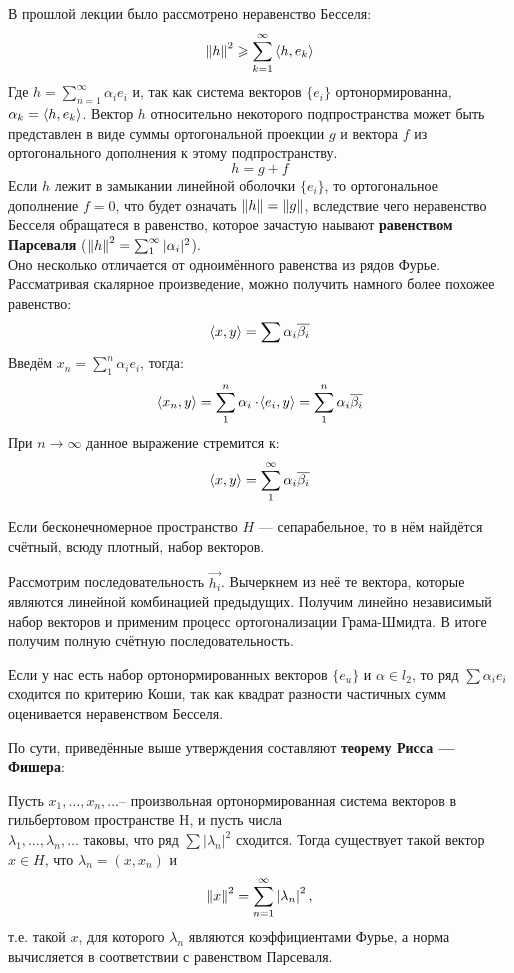 \documentclass[12pt]{article}
\begin{document}
	В прошлой лекции было рассмотрено неравенство Бесселя: \\
	$$\left\| h \right\|^2 \geqslant \sum_{k=1}^{\infty}\left\langle h, e_k \right\rangle$$
	Где $h = \sum_{n=1}^{\infty} \alpha_i e_i$ и, так как система векторов $\{ e_i \}$ ортонормированна, 
	$\alpha_k = \left\langle h, e_k \right\rangle$. Вектор $h$ относительно некоторого подпространства может быть представлен в виде суммы
	ортогональной проекции $g$ и вектора $f$ из ортогонального дополнения к этому подпространству. 
	$$h = g + f$$
	Если $h$ лежит в замыкании линейной оболочки $\{ e_i \}$, то ортогональное дополнение $f = 0$, что будет означать 
	$\left\| h \right\| = \left\| g \right\|$, вследствие чего неравенство Бесселя обращатеся в равенство, которое зачастую наывают 
	\textbf{равенством Парсеваля} ($\left\| h \right\|^2 = \sum_1^{\infty} |\alpha_i|^2$).\\
	Оно несколько отличается от одноимённого равенства из рядов Фурье. Рассматривая скалярное произведение, можно получить
	намного более похожее равенство:
	$$ \left\langle x, y \right\rangle = \sum \alpha_i \overline{\beta_i} $$
	Введём $x_n = \sum_1^n \alpha_i e_i$, тогда:
	$$ \left\langle x_n, y \right\rangle = \sum_1^n \alpha_i \cdot \! \left\langle e_i, y \right\rangle = \sum_1^n \alpha_i \overline{\beta_i}$$
	При $n \rightarrow \infty$ данное выражение стремится к:
	$$ \left\langle x, y \right\rangle = \sum_1^{\infty} \alpha_i \overline{\beta_i} $$
	
	Если бесконечномерное пространство $H$ --- сепарабельное, то в нём найдётся счётный, всюду плотный, набор векторов.
	
	Рассмотрим последовательность $\vec{h_i}$. Вычеркнем из неё те вектора, которые являются линейной комбинацией предыдущих.
	Получим линейно независимый набор векторов и применим процесс ортогонализации Грама-Шмидта. В итоге получим полную счётную 
	последовательность.
	
	Если у нас есть набор ортонормированных векторов $\{ e_u \}$ и $\alpha \in l_2$, то ряд $\sum \alpha_i e_i$ сходится по 
	критерию Коши, так как квадрат разности частичных сумм оценивается неравенством Бесселя.
	
	По сути, приведённые выше утверждения составляют \textbf{теорему Рисса --- Фишера}:
	\begin{theorem}
		Пусть $x_1, \dots ,x_n, \dots $-- произвольная ортонормированная система векторов в гильбертовом пространстве H, и пусть 
		числа \\
		$\lambda _1, \dots ,\lambda _n, \dots $ таковы, что ряд $\sum |\lambda_n|^2$ сходится. Тогда существует такой 
		вектор $x\in H$, что $\lambda _n=(x,x_n)$ и
		$$
			\left\| x \right\| ^2=\sum_{n=1}^{\infty } \left| \lambda_n \right|^2,
		$$
		т.е. такой $x$, для которого $\lambda_n$ являются коэффициентами Фурье, а норма вычисляется в 
		соответствии с равенством Парсеваля. 
	\end{theorem}
	
\end{document}
